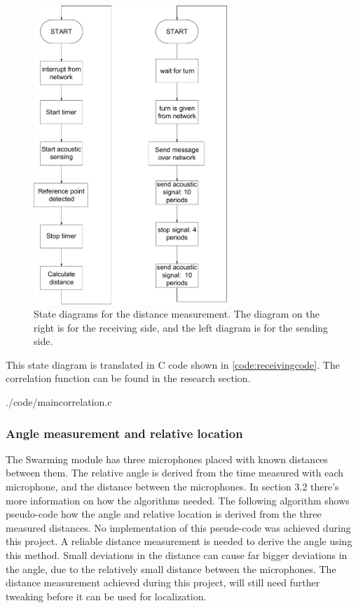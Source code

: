 \documentclass[10pt,a4paper]{article}
\begin{document}
\begin{figure}[H]
    \centering
    \includegraphics[width=0.65\textwidth]{distancem.pdf}
    \caption{State diagrams for the distance measurement. The diagram on the right is for the receiving side, and the left diagram is for the sending side.}
    \label{fig:distancemk}
\end{figure}

This state diagram is translated in C code shown in \ref{code:receivingcode}. The correlation function can be found in the research section.
\newpage

 
{./code/maincorrelation.c}


\subsubsection{Angle measurement and relative location}
The Swarming module has three microphones placed with known distances between them. The relative angle is derived from the time measured with each microphone, and the distance between the microphones. In section 3.2 there's more information on how the algorithms needed. The following algorithm shows pseudo-code how the angle and relative location is derived from the three measured distances.
No implementation of this pseude-code was achieved during this project. A reliable distance measurement is needed to derive the angle using this method. Small deviations in the distance can cause far bigger deviations in the angle, due to the relatively small distance between the microphones.
The distance measurement achieved during this project, will still need further tweaking before it can be used for localization.
\newpage
\end{document}
